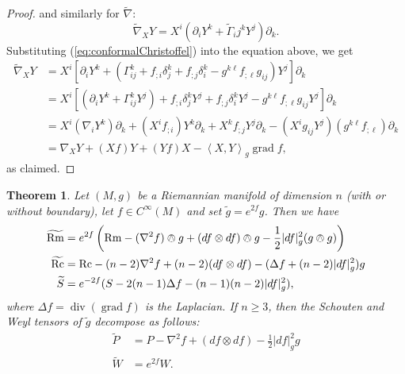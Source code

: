 \documentclass{amsart}
\numberwithin{equation}{section}
\newcommand{\del}{\partial}
\newcommand{\law}{\left\langle}
\newcommand{\raw}{\right\rangle}
\newcommand{\Rc}{\mathrm{Rc}}
\newcommand{\Rm}{\mathrm{Rm}}
\newcommand{\grad}{\mathop{\mathrm{grad}}}
\renewcommand{\div}{\mathop{\mathrm{div}}}
\theoremstyle{plain}
\newtheorem{thm}{Theorem}[section]
\theoremstyle{definition}
\theoremstyle{remark}
\begin{document}
\begin{proof}
    and similarly for $\widetilde{\nabla}$:
    \[\widetilde{\nabla}_X Y = X^i(\del_i Y^k + \widetilde{\Gamma}_ij^k Y^j)\del_k.\]
    Substituting (\ref{eq:conformalChristoffel}) into the equation above, we get
    \begin{align*}
        \tilde{\nabla}_X Y &= X^i \left[\del_i Y^k + \left(\Gamma_{ij}^k + f_{;i}\delta_j^k + f_{;j} \delta_i^k - g^{k\ell}f_{;\ell}g_{ij}\right)Y^j \right]\del_k \\ 
        &= X^i \left[(\del_i Y^k + \Gamma^k_{ij} Y^j) + f_{;i}\delta_j^kY^j  + f_{;j} \delta_i^kY^j  - g^{k\ell}f_{;\ell}g_{ij}Y^j \right]\del_k \\
        &= X^i (\nabla_i Y^k)\del_k + (X^i f_{;i})Y^k\del_k + X^k f_{;j} Y^j \del_k - (X^ig_{ij}Y^j)(g^{k\ell}f_{;\ell})\del_k \\ 
        &= \nabla_X Y + (Xf)Y + (Yf)X - \law X,Y \raw_g \grad{f},
    \end{align*}
    as claimed.
\end{proof}

\begin{thm}\label{thm:conformalcurvature}
    Let $(M,g)$ be a Riemannian manifold of dimension $n$ (with or without boundary), let $f \in C^\infty(M)$ and set $\tilde{g} = e^{2f}g$. Then we have
    \begin{align}
        \widetilde{\Rm} &= e^{2f}\left(\Rm - (\nabla^2 f) \owedge g + (df \otimes df) \owedge g - \frac{1}{2} |df|_g^2(g \owedge g) \right) \label{eq:tildeRm}\\
        \widetilde{\Rc} &= \Rc - (n-2)\nabla^2f + (n-2)(df \otimes df) - (\Delta f + (n-2)|df|_g^2)g\\
        \widetilde{S} &=  e^{-2f}(S - 2(n-1)\Delta f -(n-1)(n-2)|df|_g^2)\label{eq:tildeS},{}
    \end{align}
    where $\Delta f = \div(\grad{f})$ is the Laplacian. If $n \ge 3$, then the Schouten and Weyl tensors of $\tilde{g}$ decompose as follows:
    \begin{align}
        \widetilde{P} &= P - \nabla^2f + (df \otimes df) - \frac{1}{2}|df|_g^2 g \label{eq:tildeP}\\
        \widetilde{W} &= e^{2f}W.\label{eq:tildeW}
    \end{align}
\end{thm}
\end{document}
